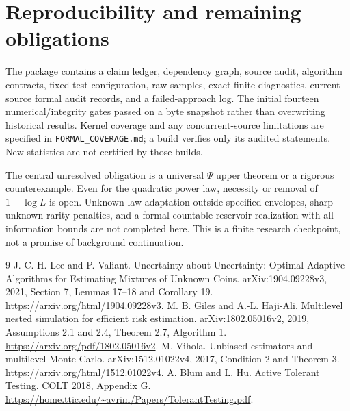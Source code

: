 \documentclass[11pt]{article}
\begin{document}
\section{Reproducibility and remaining obligations}
The package contains a claim ledger, dependency graph, source audit, algorithm
contracts, fixed test configuration, raw samples, exact finite diagnostics,
current-source formal audit records, and a failed-approach log. The initial
fourteen numerical/integrity gates passed on a byte snapshot rather than
overwriting historical results. Kernel coverage and any concurrent-source
limitations are specified in \texttt{FORMAL\_COVERAGE.md}; a build verifies
only its audited statements. New statistics are not certified by those builds.

The central unresolved obligation is a universal $\Psi$ upper theorem or a
rigorous counterexample. Even for the quadratic power law, necessity or
removal of $1+\log L$ is open. Unknown-law adaptation outside specified
envelopes, sharp unknown-rarity penalties, and a formal countable-reservoir
realization with all information bounds are not completed here. This is a
finite research checkpoint, not a promise of background continuation.

\begin{thebibliography}{9}
 J. C. H. Lee and P. Valiant.
Uncertainty about Uncertainty: Optimal Adaptive Algorithms for Estimating
Mixtures of Unknown Coins. arXiv:1904.09228v3, 2021, Section 7,
Lemmas 17--18 and Corollary 19.
\url{https://arxiv.org/html/1904.09228v3}.
 M. B. Giles and A.-L. Haji-Ali.
Multilevel nested simulation for efficient risk estimation.
arXiv:1802.05016v2, 2019, Assumptions 2.1 and 2.4, Theorem 2.7, Algorithm 1.
\url{https://arxiv.org/pdf/1802.05016v2}.
 M. Vihola. Unbiased estimators and multilevel Monte Carlo.
arXiv:1512.01022v4, 2017, Condition 2 and Theorem 3.
\url{https://arxiv.org/html/1512.01022v4}.
 A. Blum and L. Hu. Active Tolerant Testing.
COLT 2018, Appendix G.
\url{https://home.ttic.edu/~avrim/Papers/TolerantTesting.pdf}.
\end{thebibliography}
\end{document}
